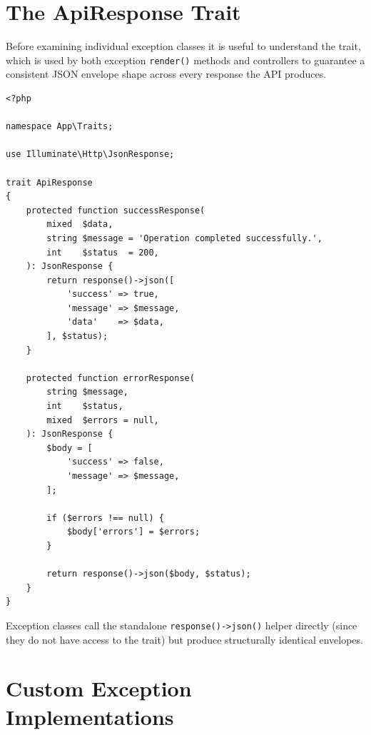 \section{The ApiResponse Trait}
\label{sec:apiresponse-trait}

Before examining individual exception classes it is useful to understand
the  trait, which is used by both exception
\texttt{render()} methods and controllers to guarantee a consistent
JSON envelope shape across every response the API produces.

\begin{lstlisting}[style=php, caption={\texttt{app/Traits/ApiResponse.php}
  --- Centralised response factory used by exceptions and controllers.}]
<?php

namespace App\Traits;

use Illuminate\Http\JsonResponse;

trait ApiResponse
{
    protected function successResponse(
        mixed  $data,
        string $message = 'Operation completed successfully.',
        int    $status  = 200,
    ): JsonResponse {
        return response()->json([
            'success' => true,
            'message' => $message,
            'data'    => $data,
        ], $status);
    }

    protected function errorResponse(
        string $message,
        int    $status,
        mixed  $errors = null,
    ): JsonResponse {
        $body = [
            'success' => false,
            'message' => $message,
        ];

        if ($errors !== null) {
            $body['errors'] = $errors;
        }

        return response()->json($body, $status);
    }
}
\end{lstlisting}

Exception classes call the standalone \texttt{response()->json()} helper
directly (since they do not have access to the 
trait) but produce structurally identical envelopes.

\section{Custom Exception Implementations}
\label{sec:exception-implementations}

